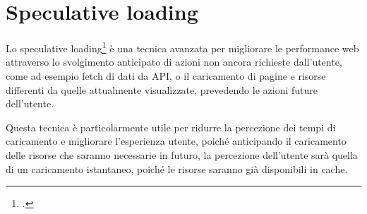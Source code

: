 \section{Speculative loading}

Lo speculative loading\footcite{speculative} è una tecnica avanzata per migliorare le performance web attraverso lo svolgimento anticipato di azioni non ancora richieste dall'utente, come ad esempio fetch di dati da API, o il caricamento di pagine e risorse differenti da quelle attualmente visualizzate, prevedendo le azioni future dell'utente.

Questa tecnica è particolarmente utile per ridurre la percezione dei tempi di caricamento e migliorare l'esperienza utente, poiché anticipando il caricamento delle risorse che saranno necessarie in futuro, la percezione dell'utente sarà quella di un caricamento istantaneo, poiché le risorse saranno già disponibili in cache.

